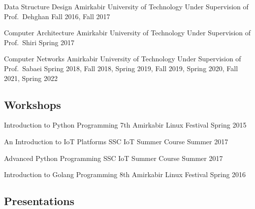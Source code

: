 \cventry{}
  {Data Structure Design}
  {}
  {Amirkabir University of Technology}
  {Under Supervision of Prof.\ Dehghan}
  {Fall 2016, Fall 2017}

\cventry{}
  {Computer Architecture}
  {}
  {Amirkabir University of Technology}
  {Under Supervision of Prof.\ Shiri}
  {Spring 2017}

\cventry{}
  {Computer Networks}
  {}
  {Amirkabir University of Technology}
  {Under Supervision of Prof.\ Sabaei}
  {Spring 2018, Fall 2018, Spring 2019, Fall 2019, Spring 2020, Fall 2021, Spring 2022}
\fi

\subsection{Workshops}

\iffalse%
\cventry{}
  {Microprocessor Lab}
  {}
  {Amirkabir University of Technology}
  {Under Supervision of Prof.\ Homayounpour}
  {Spring 2018}

\cventry{}
  {Computer Networks Lab}
  {}
  {Amirkabir University of Technology}
  {Under Supervision of Prof.\ Sabaei}
  {Spring 2018, Fall 2018, Spring 2019, Fall 2019, Spring 2020, Fall 2020, Spring 2021}

\cventry{}
  {Advanced Programming Workshop}
  {}
  {Amirkabir University of Technology}
  {Under Supervision of Prof.\ Noorhosseini}
  {Spring 2018, Fall 2019}

\cventry{}
  {Operating System Lab}
  {}
  {Amirkabir University of Technology}
  {Under Supervision of Prof.\ Zarandi}
  {Fall 2018, Fall 2019}

\cventry{}
  {Introduction to Programming Workshop}
  {}
  {Amirkabir University of Technology}
  {Under Supervision of Prof.\ Bakhshi}
  {Fall 2019}
\fi

\cventry{}
  {Introduction to Python Programming}
  {}
  {7th Amirkabir Linux Festival}
  {}
  {Spring 2015}

\cventry{}
  {An Introduction to IoT Platforms}
  {}
  {SSC IoT Summer Course}
  {}
  {Summer 2017}

\cventry{}
  {Advanced Python Programming}
  {}
  {SSC IoT Summer Course}
  {}
  {Summer 2017}

\cventry{}
  {Introduction to Golang Programming}
  {}
  {8th Amirkabir Linux Festival}
  {}
  {Spring 2016}

\subsection{Presentations}

